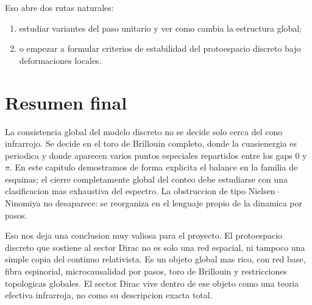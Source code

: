 Eso abre dos rutas naturales:
\begin{enumerate}[label=\arabic*.]
    \item estudiar variantes del paso unitario y ver como cambia la estructura global;
    \item o empezar a formular criterios de estabilidad del protoespacio discreto bajo deformaciones locales.
\end{enumerate}

\section{Resumen final}
La consistencia global del modelo discreto no se decide solo cerca del cono infrarrojo. Se decide en el toro de Brillouin completo, donde la cuasienergia es periodica y donde aparecen varios puntos especiales repartidos entre los gaps \(0\) y \(\pi\). En este capitulo demostramos de forma explicita el balance en la familia de esquinas; el cierre completamente global del conteo debe estudiarse con una clasificacion mas exhaustiva del espectro. La obstruccion de tipo Nielsen--Ninomiya no desaparece: se reorganiza en el lenguaje propio de la dinamica por pasos.

Eso nos deja una conclusion muy valiosa para el proyecto. El protoespacio discreto que sostiene al sector Dirac no es solo una red espacial, ni tampoco una simple copia del continuo relativista. Es un objeto global mas rico, con red base, fibra espinorial, microcausalidad por pasos, toro de Brillouin y restricciones topologicas globales. El sector Dirac vive dentro de ese objeto como una teoria efectiva infrarroja, no como su descripcion exacta total.
